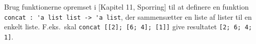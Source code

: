 Brug funktionerne opremset i [Kapitel 11, Sporring] til at definere en funktion \lstinline{concat : 'a list list -> 'a list}, der sammensætter en liste af lister til en enkelt liste.  F.eks.\ skal \lstinline{concat [[2]; [6; 4]; [1]]} give resultatet \lstinline{[2; 6; 4; 1]}.
